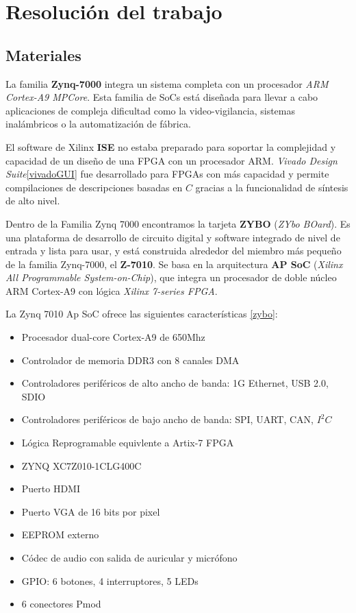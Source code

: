 
\chapter{Resolución del trabajo}
 
\section{Materiales}

La familia \textbf{Zynq-7000} integra un sistema completa con un procesador \textit{ARM Cortex-A9 MPCore}. Esta familia de SoCs está diseñada 
para llevar a cabo aplicaciones de compleja dificultad como la video-vigilancia, sistemas inalámbricos o la automatización de fábrica. 

El software de Xilinx \textbf{ISE} no estaba preparado para soportar la complejidad y capacidad de un diseño de una FPGA con un procesador 
ARM. \textit{Vivado Design Suite}\ref{vivadoGUI} fue desarrollado para FPGAs con más capacidad y permite compilaciones de descripciones 
basadas en \(C\) gracias a la funcionalidad de síntesis de alto nivel.

Dentro de la Familia Zynq 7000 encontramos la tarjeta \textbf{ZYBO} (\textit{ZYbo BOard}). Es una plataforma de desarrollo de circuito 
digital y software integrado de nivel de entrada y lista para usar, y está construida alrededor del miembro más pequeño de la familia Zynq-7000, 
el \textbf{Z-7010}. Se basa en la arquitectura \textbf{AP SoC} (\textit{Xilinx All Programmable System-on-Chip}), que integra un procesador 
de doble núcleo ARM Cortex-A9 con lógica \textit{Xilinx 7-series FPGA}.

La Zynq 7010 Ap SoC ofrece las siguientes características \ref{zybo}:
\begin{itemize}
    \item Procesador dual-core Cortex-A9 de 650Mhz
    \item Controlador de memoria DDR3 con 8 canales DMA
    \item Controladores periféricos de alto ancho de banda: 1G Ethernet, USB 2.0, SDIO
    \item Controladores periféricos de bajo ancho de banda: SPI, UART, CAN, \(I^2C\)
    \item Lógica Reprogramable equivlente a Artix-7 FPGA
    \item ZYNQ XC7Z010-1CLG400C
    \item Puerto HDMI
    \item Puerto VGA de 16 bits por pixel
    \item EEPROM externo
    \item Códec de audio con salida de auricular y micrófono 
    \item GPIO: 6 botones, 4 interruptores, 5 LEDs
    \item 6 conectores Pmod
\end{itemize}

